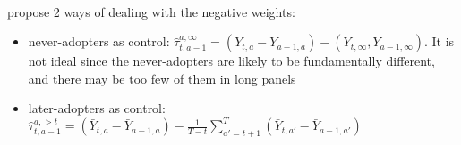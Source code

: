 \documentclass[twoside]{article}
\begin{document}
\paragraph*{\citet{callaway2021difference}} propose 2 ways of dealing with the negative weights: 
\begin{itemize}
    \item never-adopters as control: $\hat{\tau}_{t,a-1}^{a,\infty} = \left(\bar{Y}_{t,a}-\bar{Y}_{a-1,a}\right) - \left(\bar{Y}_{t,\infty},\bar{Y}_{a-1,\infty}\right) $. It is not ideal since the never-adopters are likely to be fundamentally different, and there may be too few of them in long panels
    \item later-adopters as control: $\hat{\tau}_{t,a-1}^{a,>t} = \left(\bar{Y}_{t,a}-\bar{Y}_{a-1,a}\right) - \frac{1}{T-t} \sum^T_{a'=t+1}\left(\bar{Y}_{t,a'}-\bar{Y}_{a-1,a'}\right) $
\end{itemize}
\end{document}
